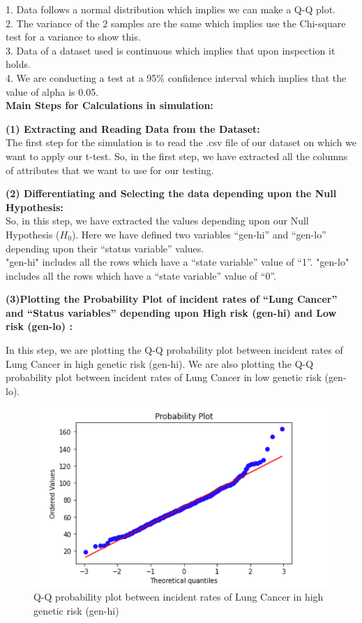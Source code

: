 \documentclass{article}
\begin{document}
\begin{enumerate}
		1. Data follows a normal distribution which implies we can make a Q-Q plot.\\
		2. The variance of the 2 samples are the same which implies use the Chi-square test for a variance to show this. \\
		3. Data of a dataset used is continuous which implies that upon inspection it holds.\\
		4. We are conducting a test at a 95\% confidence interval which implies that the value of alpha is 0.05. \\ 
		
		\textbf{\large Main Steps for Calculations in simulation:} 
		
		\textbf{(1) Extracting and Reading Data from the Dataset:} \\
		The first step for the simulation is to read the .csv file of our dataset on which we want to apply our t-test. So, in the first step, we have extracted all the columns of attributes that we want to use for our testing.  
		
		\textbf{(2) Differentiating and Selecting the data depending upon the Null Hypothesis:} \\
		So, in this step, we have extracted the values depending upon our Null Hypothesis ($H_{0}$). Here we have defined two variables “gen-hi” and “gen-lo” depending upon their “status variable” values.
		\\"gen-hi" includes all the rows which have a “state variable” value of “1”.
		"gen-lo" includes all the rows which have a “state variable” value of “0”. 
		
		\textbf{(3)Plotting the Probability Plot of incident rates of “Lung Cancer” and “Status variables” depending upon High risk (gen-hi) and Low risk (gen-lo) :}
		
		In this step, we are plotting the Q-Q probability plot between incident rates of Lung Cancer in high genetic risk (gen-hi). We are also plotting the Q-Q probability plot between incident rates of Lung Cancer in low genetic risk (gen-lo). 
		
		
		\begin{figure}[htbp]
			\centerline{\includegraphics[scale=.5]{1.png}}
			\caption{Q-Q probability plot between incident rates of Lung Cancer in high genetic risk (gen-hi)}%
			

\end{figure}
\end{enumerate}
\end{document}

